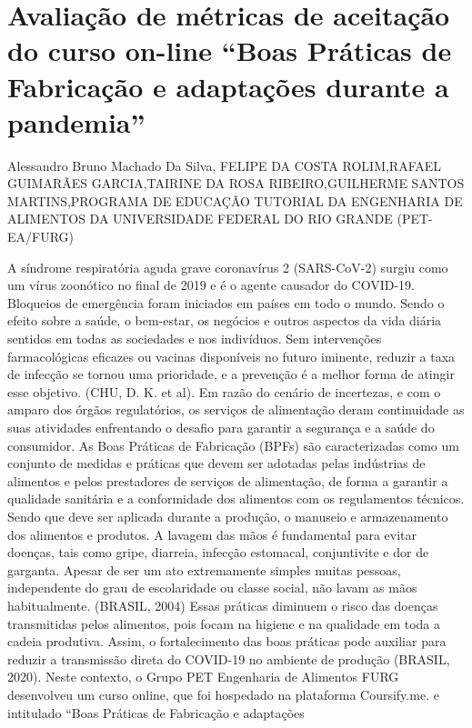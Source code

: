 

\section{Avaliação de métricas de aceitação do curso on-line “Boas Práticas de Fabricação e adaptações durante a pandemia”}

Alessandro Bruno Machado Da Silva, FELIPE DA COSTA ROLIM,RAFAEL GUIMARÃES GARCIA,TAIRINE DA ROSA RIBEIRO,GUILHERME SANTOS MARTINS,PROGRAMA DE EDUCAÇÃO TUTORIAL DA ENGENHARIA DE ALIMENTOS DA UNIVERSIDADE FEDERAL DO RIO GRANDE (PET-EA/FURG)

A síndrome respiratória aguda grave coronavírus 2 (SARS-CoV-2) surgiu como um vírus 
zoonótico no final de 2019 e é o agente causador do COVID-19. Bloqueios de emergência foram 
iniciados em países em todo o mundo. Sendo o efeito sobre a saúde, o bem-estar, os negócios e 
outros aspectos da vida diária sentidos em todas as sociedades e nos indivíduos. Sem intervenções 
farmacológicas eficazes ou vacinas disponíveis no futuro iminente, reduzir a taxa de infecção se
tornou uma prioridade, e a prevenção é a melhor forma de atingir esse objetivo. (CHU, D. K. et 
al). Em razão do cenário de incertezas, e com o amparo dos órgãos regulatórios, os serviços de 
alimentação deram continuidade as suas atividades enfrentando o desafio para garantir a segurança 
e a saúde do consumidor.
As Boas Práticas de Fabricação (BPFs) são caracterizadas como um conjunto de medidas e práticas 
que devem ser adotadas pelas indústrias de alimentos e pelos prestadores de serviços de 
alimentação, de forma a garantir a qualidade sanitária e a conformidade dos alimentos com os 
regulamentos técnicos. Sendo que deve ser aplicada durante a produção, o manuseio e 
armazenamento dos alimentos e produtos. A lavagem das mãos é fundamental para evitar doenças, 
tais como gripe, diarreia, infecção estomacal, conjuntivite e dor de garganta. Apesar de ser um ato 
extremamente simples muitas pessoas, independente do grau de escolaridade ou classe social, não 
lavam as mãos habitualmente. (BRASIL, 2004)
Essas práticas diminuem o risco das doenças transmitidas pelos alimentos, pois focam na higiene 
e na qualidade em toda a cadeia produtiva. Assim, o fortalecimento das boas práticas pode auxiliar 
para reduzir a transmissão direta do COVID-19 no ambiente de produção (BRASIL, 2020).
Neste contexto, o Grupo PET Engenharia de Alimentos FURG desenvolveu um curso online, que 
foi hospedado na plataforma Coursify.me. e intitulado “Boas Práticas de Fabricação e adaptações 
